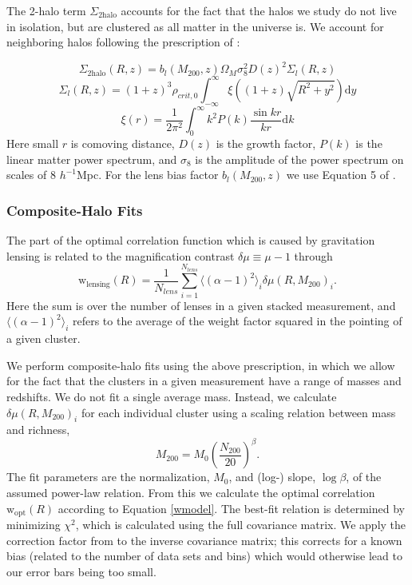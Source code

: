 The 2-halo term $\Sigma_{\mathrm{2halo}}$ accounts for the fact that the halos we study do not live in isolation, but are clustered as all matter in the universe is. We account for neighboring halos following the prescription of \citet{Johnston07}:

\begin{equation}
\Sigma_{\mathrm{2halo}}(R,z) = b_{l}(M_{200},z) \Omega_M \sigma_8^2 D(z)^2 \Sigma_l(R,z)
\end{equation}
\begin{equation}
\Sigma_l(R,z) = (1+z)^3 \rho_{crit,0} \int_{-\infty}^\infty \xi\left( (1+z)\sqrt{R^2 + y^2} \right) \mathrm{d}y
\end{equation}
\begin{equation}
\xi(r) = \frac{1}{2\pi^2} \int_0^\infty k^2 P(k) \frac{\sin{kr}}{kr} \mathrm{d}k
\end{equation}
Here small $r$ is comoving distance, $D(z)$ is the growth factor, $P(k)$ is the linear matter power spectrum, and $\sigma_8$ is the amplitude of the power spectrum on scales of 8 $h^{-1}$Mpc. For the lens bias factor $b_{l}(M_{200},z)$ we use Equation 5 of \citet{Seljak04}.


\subsubsection{Composite-Halo Fits}
\label{multihalo}
The part of the optimal correlation function which is caused by gravitation lensing is related to the magnification contrast $\delta\mu \equiv \mu-1$ through
\begin{equation}
\label{wmodel}
\mathrm{w}_{\mathrm{lensing}}(R) = \frac{1}{N_{lens}} \sum_{i=1}^{N_{lens}} \langle(\alpha-1)^2\rangle_i \delta\mu(R,M_{200})_i.
\end{equation}
Here the sum is over the number of lenses in a given stacked measurement, and $\langle(\alpha-1)^2\rangle_i$ refers to the average of the weight factor squared in the pointing of a given cluster.

We perform composite-halo fits using the above prescription, in which we allow for the fact that the clusters in a given measurement have a range of masses and redshifts. We do not fit a single average mass. Instead, we calculate $\delta\mu(R,M_{200})_i$ for each individual cluster using a scaling relation between mass and richness,
\begin{equation}
\label{mr}
M_{200} = M_0 \left( \frac{N_{200}}{20} \right)^\beta.
\end{equation}
The fit parameters are the normalization, $M_0$, and (log-) slope, $\log\beta$, of the assumed power-law relation. From this we calculate the optimal correlation $\mathrm{w}_{\mathrm{opt}}(R)$ according to Equation \ref{wmodel}. The best-fit relation is determined by minimizing $\chi^2$, which is calculated using the full covariance matrix. We apply the correction factor from \citet{Hartlap07} to the inverse covariance matrix; this corrects for a known bias (related to the number of data sets and bins) which would otherwise lead to our error bars being too small.


